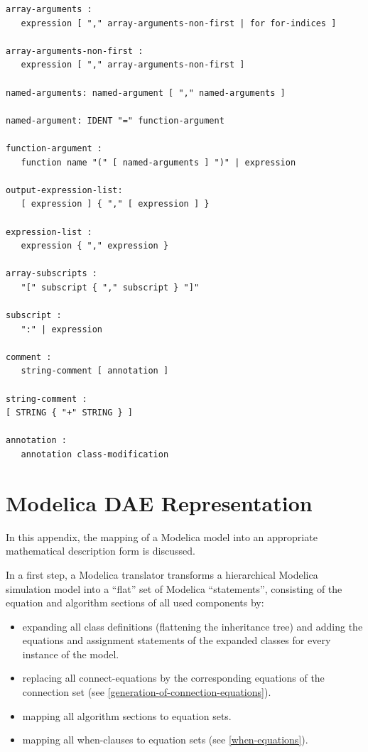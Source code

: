 \documentclass[10pt,a4paper]{report}
\def\doublelabel#1{\label{#1}}
\begin{document}
\begin{lstlisting}[language=grammar]
array-arguments :
   expression [ "," array-arguments-non-first | for for-indices ]

array-arguments-non-first :
   expression [ "," array-arguments-non-first ]

named-arguments: named-argument [ "," named-arguments ]

named-argument: IDENT "=" function-argument

function-argument :
   function name "(" [ named-arguments ] ")" | expression
   
output-expression-list:
   [ expression ] { "," [ expression ] }
   
expression-list :
   expression { "," expression }
   
array-subscripts :
   "[" subscript { "," subscript } "]"
   
subscript :
   ":" | expression
   
comment :
   string-comment [ annotation ]
   
string-comment :
[ STRING { "+" STRING } ]

annotation :
   annotation class-modification
\end{lstlisting}
\chapter{Modelica DAE Representation}\doublelabel{modelica-dae-representation}

In this appendix, the mapping of a Modelica model into an appropriate
mathematical description form is discussed.

In a first step, a Modelica translator transforms a hierarchical
Modelica simulation model into a ``flat'' set of Modelica
``statements'', consisting of the equation and algorithm sections of all
used components by:

\begin{itemize}
\item
  expanding all class definitions (flattening the inheritance tree) and
  adding the equations and assignment statements of the expanded classes
  for every instance of the model.
\item
  replacing all connect-equations by the corresponding equations of the
  connection set (see \ref{generation-of-connection-equations}).
\item
  mapping all algorithm sections to equation sets.
\item
  mapping all when-clauses to equation sets (see \ref{when-equations}).
\end{itemize}
\end{document}
